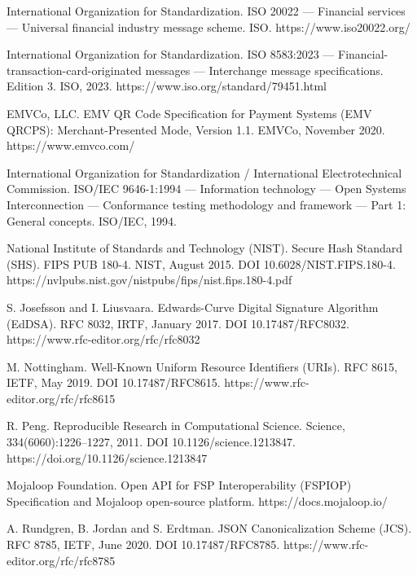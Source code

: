 \documentclass[journal abbreviation, manuscript]{copernicus}
\begin{document}
{\small
\begin{list}{}{%
  \setlength{\labelsep}{0.5em}%
  \setlength{\labelwidth}{1.8em}%
  \setlength{\leftmargin}{2.3em}%
  \setlength{\itemindent}{0pt}%
  \setlength{\itemsep}{3pt}%
  \setlength{\parsep}{0pt}}
\sloppy
\item[{[1]}] International Organization for Standardization. ISO 20022 --- Financial services --- Universal financial industry message scheme. ISO. https://www.iso20022.org/
\item[{[2]}] International Organization for Standardization. ISO 8583:2023 --- Financial-transaction-card-originated messages --- Interchange message specifications. Edition 3. ISO, 2023. https://www.iso.org/standard/79451.html
\item[{[3]}] EMVCo, LLC. EMV QR Code Specification for Payment Systems (EMV QRCPS): Merchant-Presented Mode, Version 1.1. EMVCo, November 2020. https://www.emvco.com/
\item[{[4]}] International Organization for Standardization / International Electrotechnical Commission. ISO/IEC 9646-1:1994 --- Information technology --- Open Systems Interconnection --- Conformance testing methodology and framework --- Part 1: General concepts. ISO/IEC, 1994.
\item[{[5]}] National Institute of Standards and Technology (NIST). Secure Hash Standard (SHS). FIPS PUB 180-4. NIST, August 2015. DOI 10.6028/NIST.FIPS.180-4. https://nvlpubs.nist.gov/nistpubs/fips/nist.fips.180-4.pdf
\item[{[6]}] S. Josefsson and I. Liusvaara. Edwards-Curve Digital Signature Algorithm (EdDSA). RFC 8032, IRTF, January 2017. DOI 10.17487/RFC8032. https://www.rfc-editor.org/rfc/rfc8032
\item[{[7]}] M. Nottingham. Well-Known Uniform Resource Identifiers (URIs). RFC 8615, IETF, May 2019. DOI 10.17487/RFC8615. https://www.rfc-editor.org/rfc/rfc8615
\item[{[8]}] R. Peng. Reproducible Research in Computational Science. Science, 334(6060):1226--1227, 2011. DOI 10.1126/science.1213847. https://doi.org/10.1126/science.1213847
\item[{[9]}] Mojaloop Foundation. Open API for FSP Interoperability (FSPIOP) Specification and Mojaloop open-source platform. https://docs.mojaloop.io/
\item[{[10]}] A. Rundgren, B. Jordan and S. Erdtman. JSON Canonicalization Scheme (JCS). RFC 8785, IETF, June 2020. DOI 10.17487/RFC8785. https://www.rfc-editor.org/rfc/rfc8785
\end{list}}
\end{document}
